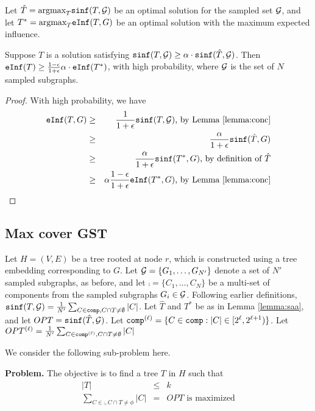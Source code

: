 Let $\hat{T}=\text{argmax}_T \texttt{sinf}(T,\mathcal{G})$ 
be an optimal solution for the sampled set $\mathcal{G}$, and let $T^*=\text{argmax}_T \texttt{eInf}(T, G)$ be an optimal solution with the maximum expected influence.

\begin{lemma}
\label{lemma:saa}
Suppose $T$ is a solution satisfying 
$\texttt{sinf}(T, \mathcal{G})\geq \alpha\cdot \texttt{sinf}(\hat{T}, \mathcal{G})$. Then
$\texttt{eInf}(T)\geq\frac{1-\epsilon}{1+\epsilon}\alpha\cdot\texttt{eInf}(T^*)$, with high probability, where $\mathcal{G}$ is the set of $N$ sampled subgraphs.
\end{lemma}
\begin{proof}
With high probability, we have
\begin{eqnarray*}
\texttt{eInf}(T, G) &\geq& \frac{1}{1+\epsilon}\texttt{sinf}(T,\mathcal{G}) \mbox{, by Lemma \ref{lemma:conc}}\\
&\geq& \frac{\alpha}{1+\epsilon} \texttt{sinf}(\hat{T}, G)\\
&\geq& \frac{\alpha}{1+\epsilon} \texttt{sinf}(T^*, G) \mbox{, by definition of $\hat{T}$}\\
&\geq& \alpha\frac{1-\epsilon}{1+\epsilon}\texttt{eInf}(T^*,G) \mbox{, by Lemma \ref{lemma:conc}}
\end{eqnarray*}

\end{proof}

\subsection{Max cover GST}
\label{sec:max-cover-gst}

Let $H=(V, E)$ be a tree rooted at node $r$, which is constructed using a tree  embedding corresponding to $G$. Let $\mathcal{G}=\{G_1,\ldots,G_{N'}\}$ denote a set of $N'$ sampled subgraphs, as before, and let $\comp=\{C_1,\ldots,C_N\}$ be a multi-set of components from the sampled subgraphs $G_i\in\mathcal{G}$. 
Following earlier definitions, $\texttt{sinf}(T,\mathcal{G})=\frac{1}{N'}\sum_{C\in\texttt{comp}, C\cap T\neq\emptyset} |C|$.
Let $\hat{T}$ and $T^*$ be as in Lemma \ref{lemma:saa}, and let 
$OPT=\texttt{sinf}(\hat{T},\mathcal{G})$. 
Let $\texttt{comp}^{(\ell)} = \{C\in\texttt{comp}: |C|\in[2^{\ell}, 2^{\ell+1})\}$.
Let $OPT^{(\ell)}=\frac{1}{N'}\sum_{C\in\texttt{comp}^{(\ell)}, C\cap T\neq\emptyset} |C|$

We consider the following sub-problem here.

\noindent
\textbf{Problem.}
The objective is to find a tree $T$ in $H$ such that
\begin{eqnarray*}
|T| &\leq& k\\
\sum_{C\in\comp, C\cap T\neq\phi} |C| &=& OPT \mbox{ is maximized}
\end{eqnarray*}


